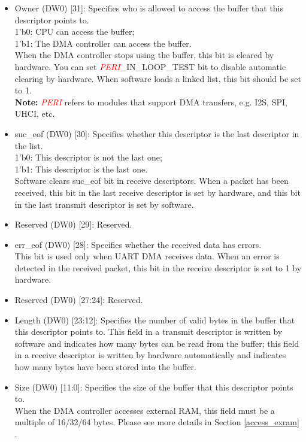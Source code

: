 \documentclass[main\_\_EN.tex]{subfiles}
\begin{document}
\begin{itemize}
    \item Owner (DW0) [31]: Specifies who is allowed to access the buffer that this descriptor points to.\\
    1'b0: CPU can access the buffer; \\
    1'b1: The DMA controller can access the buffer.\\
    When the DMA controller stops using the buffer, this bit is cleared by hardware. You can set \textcolor{red}{\it{PERI}}\_IN\_LOOP\_TEST bit to disable automatic clearing by hardware. When software loads a linked list, this bit should be set to 1.
    \\{\bfseries Note:} \textcolor{red}{\it{PERI}} refers to modules that support DMA transfers, e.g. I2S, SPI, UHCI, etc.
    \item suc\_eof (DW0) [30]: Specifies whether this descriptor is the last descriptor in the list.\\
    1'b0: This descriptor is not the last one;\\
    1'b1: This descriptor is the last one.\\
    Software clears suc\_eof bit in receive descriptors. When a packet has been received, this bit in the last receive descriptor is set by hardware, and this bit in the last transmit descriptor is set by software.
    \item Reserved (DW0) [29]: Reserved.
    \item err\_eof (DW0) [28]: Specifies whether the received data has errors.\\
    This bit is used only when UART DMA receives data. When an error is detected in the received packet, this bit in the receive descriptor is set to 1 by hardware.\\
    \item Reserved (DW0) [27:24]: Reserved.
    \item Length (DW0) [23:12]: Specifies the number of valid bytes in the buffer that this descriptor points to. This field in a transmit descriptor is written by software and indicates how many bytes can be read from the buffer; this field in a receive descriptor is written by hardware automatically and indicates how many bytes have been stored into the buffer.
    \item Size (DW0) [11:0]: Specifies the size of the buffer that this descriptor points to.\\
    When the DMA controller accesses external RAM, this field must be a multiple of 16/32/64 bytes. Please see more details in Section \ref{access_exram} \textit{}.

\end{itemize}
\end{document}
